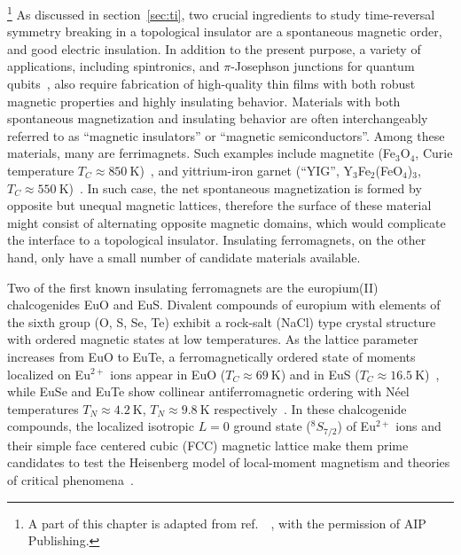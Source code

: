 \footnote[2]{A part of this chapter is adapted from ref.~\cite{EuS_PLD}~, with the permission of AIP Publishing.}%
As discussed in section~\ref{sec:ti}, two crucial ingredients to study time-reversal symmetry breaking in a topological insulator are a spontaneous magnetic order, and good electric insulation. In addition to the present purpose, a variety of applications, including spintronics, and $\pi$-Josephson junctions for quantum qubits~\cite{pi_qubit, pi_junction, Wolf2001, EuS_spin_filter, EuS_app1, EuS_spin_filter2}, also require fabrication of high-quality thin films with both robust magnetic properties and highly insulating behavior. Materials with both spontaneous magnetization and insulating behavior are often interchangeably referred to as ``magnetic insulators'' or ``magnetic semiconductors''. Among these materials, many are ferrimagnets. Such examples include magnetite (Fe$_3$O$_4$, Curie temperature $T_C\approx850~\mathrm{K}$)~\cite{Neel1948}, and yittrium-iron garnet (``YIG'', Y$_3$Fe$_2$(FeO$_4$)$_3$, $T_C\approx550~\mathrm{K}$)~\cite{YIG}. In such case, the net spontaneous magnetization is formed by opposite but unequal magnetic lattices, therefore the surface of these material might consist of alternating opposite magnetic domains, which would complicate the interface to a topological insulator. Insulating ferromagnets, on the other hand, only have a small number of candidate materials available.

Two of the first known insulating ferromagnets are the europium(II) chalcogenides EuO and EuS. Divalent compounds of europium with elements of the sixth group (O, S, Se, Te) exhibit a rock-salt (NaCl) type crystal structure with ordered magnetic states at low temperatures. As the lattice parameter increases from EuO to EuTe, a ferromagnetically ordered state of moments localized on Eu$^{2+}$ ions appear in EuO ($T_C\approx69~\mathrm{K}$) and in EuS ($T_C\approx16.5~\mathrm{K}$)~\cite{EuO_TC, EuS_Shafer, EuS_specific_heat}, while EuSe and EuTe show collinear antiferromagnetic ordering with N\'eel temperatures $T_N\approx4.2~\mathrm{K}$, $T_N\approx9.8~\mathrm{K}$ respectively~\cite{EuSe_AF, EuTe_AF}. In these chalcogenide compounds, the localized isotropic $L=0$ ground state ($^8S_{7/2}$) of Eu$^{2+}$ ions and their simple face centered cubic (FCC) magnetic lattice make them prime candidates to test the Heisenberg model of local-moment magnetism and theories of critical phenomena~\cite{divalent_Eu, EuX_indirect_exchange, EuS_neighbor_exchange, EuS_critical, EuS_neutron, EuS_spin_wave}.

